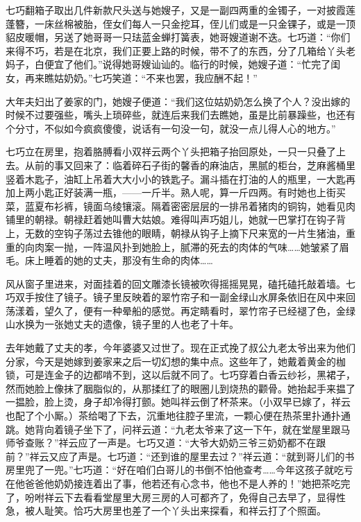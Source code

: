 \par 七巧翻箱子取出几件新款尺头送与她嫂子，又是一副四两重的金镯子，一对披霞莲蓬簪，一床丝棉被胎，侄女们每人一只金挖耳，侄儿们或是一只金锞子，或是一顶貂皮暖帽，另送了她哥哥一只珐蓝金蝉打簧表，她哥嫂道谢不迭。七巧道：“你们来得不巧，若是在北京，我们正要上路的时候，带不了的东西，分了几箱给丫头老妈子，白便宜了他们。”说得她哥嫂讪讪的。临行的时候，她嫂子道：“忙完了闺女，再来瞧姑奶奶。”七巧笑道：“不来也罢，我应酬不起！”
\par 大年夫妇出了姜家的门，她嫂子便道：“我们这位姑奶奶怎么换了个人？没出嫁的时候不过要强些，嘴头上琐碎些，就连后来我们去瞧她，虽是比前暴躁些，也还有个分寸，不似如今疯疯傻傻，说话有一句没一句，就没一点儿得人心的地方。”
\par 七巧立在房里，抱着胳膊看小双祥云两个丫头把箱子抬回原处，一只一只叠了上去。从前的事又回来了：临着碎石子街的馨香的麻油店，黑腻的柜台，芝麻酱桶里竖着木匙子，油缸上吊着大大小小的铁匙子。漏斗插在打油的人的瓶里，一大匙再加上两小匙正好装满一瓶，——一斤半。熟人呢，算一斤四两。有时她也上街买菜，蓝夏布衫裤，镜面乌绫镶滚。隔着密密层层的一排吊着猪肉的铜钩，她看见肉铺里的朝禄。朝禄赶着她叫曹大姑娘。难得叫声巧姐儿，她就一巴掌打在钩子背上，无数的空钩子荡过去锥他的眼睛，朝禄从钩子上摘下尺来宽的一片生猪油，重重的向肉案一抛，一阵温风扑到她脸上，腻滞的死去的肉体的气味……她皱紧了眉毛。床上睡着的她的丈夫，那没有生命的肉体……
\par 风从窗子里进来，对面挂着的回文雕漆长镜被吹得摇摇晃晃，磕托磕托敲着墙。七巧双手按住了镜子。镜子里反映着的翠竹帘子和一副金绿山水屏条依旧在风中来回荡漾着，望久了，便有一种晕船的感觉。再定睛看时，翠竹帘子已经褪了色，金绿山水换为一张她丈夫的遗像，镜子里的人也老了十年。
\par 去年她戴了丈夫的孝，今年婆婆又过世了。现在正式挽了叔公九老太爷出来为他们分家，今天是她嫁到姜家来之后一切幻想的集中点。这些年了，她戴着黄金的枷锁，可是连金子的边都啃不到，这以后就不同了。七巧穿着白香云纱衫，黑裙子，然而她脸上像抹了胭脂似的，从那揉红了的眼圈儿到烧热的颧骨。她抬起手来揾了一揾脸，脸上烫，身子却冷得打颤。她叫祥云倒了杯茶来。（小双早已嫁了，祥云也配了个小厮。）茶给喝了下去，沉重地往腔子里流，一颗心便在热茶里扑通扑通跳。她背向着镜子坐下了，问祥云道：“九老太爷来了这一下午，就在堂屋里跟马师爷查账？”祥云应了一声是。七巧又道：“大爷大奶奶三爷三奶奶都不在跟前？”祥云又应了声是。七巧道：“还到谁的屋里去过？”祥云道：“就到哥儿们的书房里兜了一兜。”七巧道：“好在咱们白哥儿的书倒不怕他查考……今年这孩子就吃亏在他爸爸他奶奶接连着出了事，他若还有心念书，他也不是人养的！”她把茶吃完了，吩咐祥云下去看看堂屋里大房三房的人可都齐了，免得自己去早了，显得性急，被人耻笑。恰巧大房里也差了一个丫头出来探看，和祥云打了个照面。
